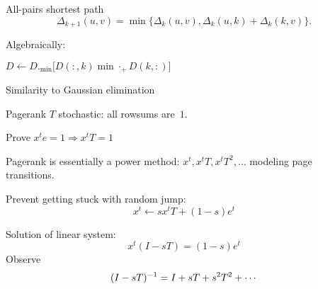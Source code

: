 \begin{comment}
\begin{numberedframe}{Matrix formulation}
Let 
\[ x_i = 
\begin{cases}
  1&i=s\\ \infty&\hbox{otherwise}
\end{cases}
\]
Let $x$ zero except in~$i$,\\
then $x^tG$ nonzero in $j$ if there is an edge $(i,j)$
\end{numberedframe}

\begin{numberedframe}{Matrix algorithm}
  
Define a product as
\[ y^t=x^tG\equiv \forall_i\colon
  (y^t)_j = \min_{i\colon G_{ij}\not=0} x_i+1,
\]
Iterate
\[ x,x^tG,x^tG^2,\ldots \]
After $k$ (diameter) iterations $(x^tG^k)_i$ is the distance $d(s, i)$.
\end{numberedframe}

\begin{numberedframe}{Single Source Shortest Path}
  Similar to previous, but non-unit edge weights
\begin{displayalgorithm}
  Let $s$ be given, and set $d(s)=0$\;
  Set $d(v)=\infty$ for all other nodes~$v$\;
  \For{$|E|-1$ times}{
    \For{all edges $e=(u,v)$}{
      Relax: \If{$d(u)+w_{uv}<d(v)$}{Set $d(v)\leftarrow d(u)+w_{uv}$}
    }
  }
\end{displayalgorithm}
\[ y^t=x^tG\equiv \forall_i\colon
  y_j = \min\bigl\{ x_j, \min_{i\colon G_{ij}\not=0} \{x_i+g_{ij}\} \bigr\},
\]
\end{numberedframe}
\end{comment}

\begin{numberedframe}{All-pairs shortest path}
\begin{equation}
  \Delta_{k+1}(u,v) = \min\bigl\{ \Delta_k(u,v),
  \Delta_k(u,k)+\Delta_k(k,v) \bigr\}.
  \label{eq:floyd-allpairs}
\end{equation}

Algebraically:
\begin{displayalgorithm}
   {
    $D\leftarrow D._{\min} \bigl[D(:,k) \mathbin{\min\cdot_+} D(k,:) \bigr]$
  }
\end{displayalgorithm}
Similarity to Gaussian elimination  
\end{numberedframe}

\begin{numberedframe}{Pagerank}
  $T$ stochastic: all rowsums are~$1$.

  Prove $x^te=1\Rightarrow x^tT=1$

  Pagerank is essentially a power method: $x^t,x^tT,x^tT^2,\ldots$
  modeling page transitions.

  Prevent getting stuck with random jump: \[ x^t\leftarrow sx^tT+(1-s)e^t \]

  Solution of linear system: \[ x^t(I-sT)=(1-s)e^t \]
  Observe \[ (I-sT)^{-1} = I+sT+s^2T^2+\cdots \]
\end{numberedframe}

